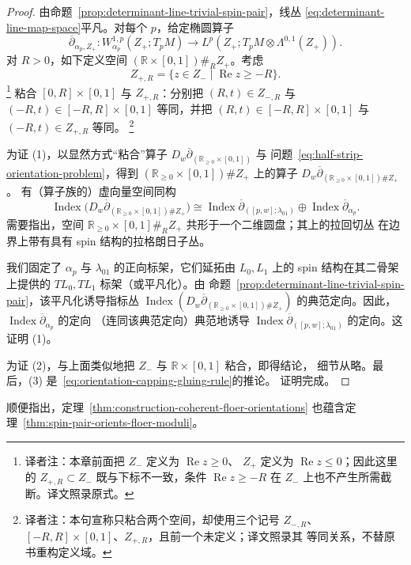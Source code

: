 \begin{proof}
由命题~\ref{prop:determinant-line-trivial-spin-pair}，线丛
\eqref{eq:determinant-line-map-space}平凡。对每个 $p$，给定椭圆算子
\[
 \overline\partial_{\alpha_p,Z_+}:W_{\alpha_p}^{1,p}(Z_+;T_pM)
 \longrightarrow L^p(Z_+;T_pM\otimes\Lambda^{0,1}(Z_+)).
\]
对 $R>0$，如下定义空间 $(\mathbb R\times[0,1])\#_RZ_+$。考虑
\[
 Z_{+,R}=\{z\in Z_-\mid\operatorname{Re}z\geq-R\}.
\]
\footnote{译者注：本章前面把 $Z_-$ 定义为 $\operatorname{Re}z\geq0$、
$Z_+$ 定义为 $\operatorname{Re}z\leq0$；因此这里的
$Z_{+,R}\subset Z_-$ 既与下标不一致，条件 $\operatorname{Re}z\geq-R$
在 $Z_-$ 上也不产生所需截断。译文照录原式。}
粘合 $[0,R]\times[0,1]$ 与 $Z_{+,R}$：分别把
$(R,t)\in Z_{-,R}$ 与 $(-R,t)\in[-R,R]\times[0,1]$ 等同，并把
$(R,t)\in[-R,R]\times[0,1]$ 与 $(-R,t)\in Z_{+,R}$ 等同。
\footnote{译者注：本句宣称只粘合两个空间，却使用三个记号
$Z_{-,R}$、$[-R,R]\times[0,1]$、$Z_{+,R}$，且前一个未定义；译文照录其
等同关系，不替原书重构定义域。}

为证 (1)，以显然方式“粘合”算子
$D_w\overline\partial_{(\mathbb R_{\geq0}\times[0,1])}$ 与
问题~\eqref{eq:half-strip-orientation-problem}，得到
$(\mathbb R_{\geq0}\times[0,1])\#Z_+$ 上的算子
$D_w\overline\partial_{(\mathbb R_{\geq0}\times[0,1])\#Z_+}$。
有（算子族的）虚向量空间同构
\begin{equation}
 \operatorname{Index}
 \bigl(D_w\overline\partial_{(\mathbb R_{\geq0}\times[0,1])\#Z_+}\bigr)
 \cong\operatorname{Index}\overline\partial_{([p,w];\lambda_{01})}
 \oplus\operatorname{Index}\overline\partial_{\alpha_p}.
 \label{eq:orientation-index-gluing-isomorphism}
\end{equation}
需要指出，空间
$\mathbb R_{\geq0}\times[0,1]\#_RZ_+$ 共形于一个二维圆盘；其上的拉回切丛
在边界上带有具有 spin 结构的拉格朗日子丛。

我们固定了 $\alpha_p$ 与 $\lambda_{01}$ 的正向标架，它们延拓由 $L_0,L_1$
上的 spin 结构在其二骨架上提供的 $TL_0,TL_1$ 标架（或平凡化）。由
命题~\ref{prop:determinant-line-trivial-spin-pair}，该平凡化诱导指标丛
$\operatorname{Index}
(D_w\overline\partial_{(\mathbb R_{\geq0}\times[0,1])\#Z_+})$
的典范定向。因此，$\operatorname{Index}\overline\partial_{\alpha_p}$ 的定向
（连同该典范定向）典范地诱导
$\operatorname{Index}\overline\partial_{([p,w];\lambda_{01})}$ 的定向。这证明 (1)。

为证 (2)，与上面类似地把 $Z_-$ 与 $\mathbb R\times[0,1]$ 粘合，即得结论，
细节从略。最后，(3) 是~\eqref{eq:orientation-capping-gluing-rule}的推论。
证明完成。
\end{proof}

顺便指出，定理~\ref{thm:construction-coherent-floer-orientations}
也蕴含定理~\ref{thm:spin-pair-orients-floer-moduli}。
